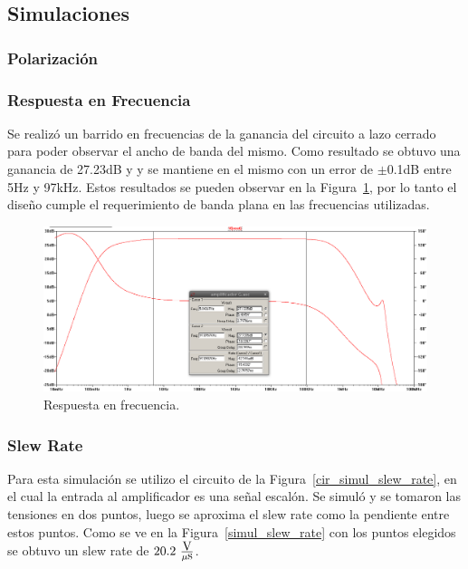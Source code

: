 \subsection{Simulaciones}
\bigskip
\subsubsection{Polarización}

\subsubsection{Respuesta en Frecuencia}

Se realizó un barrido en frecuencias de la ganancia del circuito a lazo cerrado para poder observar el ancho de banda del mismo. Como resultado se obtuvo una ganancia de 27.23dB y y se mantiene en el mismo con un error de $\pm$0.1dB entre 5Hz y 97kHz.
Estos resultados se pueden observar en la Figura~\ref{resp_frec}, por lo tanto el diseño cumple el requerimiento de banda plana en las frecuencias utilizadas. 

\begin{figure}[H]
\centering
\centerline{
\includegraphics[width=\textwidth]{img/ancho_de_banda.png}}
\caption{Respuesta en frecuencia.}
\label{resp_frec} 
\end{figure}

\bigskip
\subsubsection{Slew Rate}

Para esta simulación se utilizo el circuito de la Figura~\ref{cir_simul_slew_rate}, en el cual la entrada al amplificador es una señal escalón. Se simuló y se tomaron las tensiones en dos puntos, luego se aproxima el slew rate como la pendiente entre estos puntos. Como se ve en la Figura~\ref{simul_slew_rate} con los puntos elegidos se obtuvo un slew rate de $20.2~ \frac{\mbox{V}}{\mu\mbox{s}}$.

